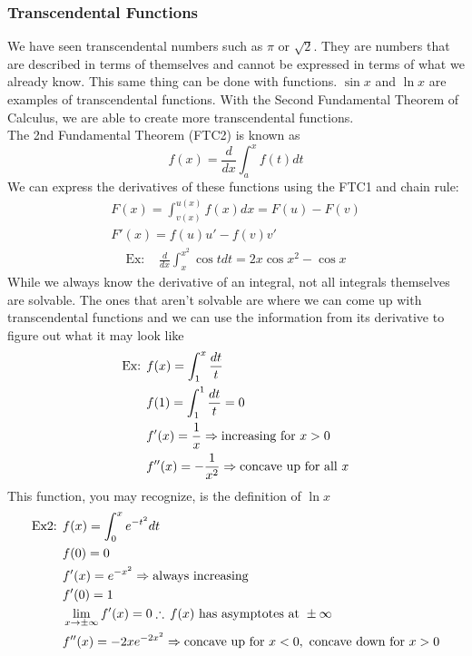 \documentclass[11pt, fleqn]{article}
\begin{document}
\subsubsection{Transcendental Functions}
We have seen transcendental numbers such as $\pi$ or $\sqrt{2}$. They are numbers that are described in terms of themselves and cannot be expressed in terms of what we already know. This same thing can be done with functions. $\sin x$ and $\ln x$ are examples of transcendental functions. With the Second Fundamental Theorem of Calculus, we are able to create more transcendental functions.\\
The 2nd Fundamental Theorem (FTC2) is known as
$$f(x)=\frac{d}{dx}\int_a^xf(t)dt$$
We can express the derivatives of these functions using the FTC1 and chain rule:\\
\begin{align*}
    F(x)=\displaystyle{\int^{u(x)}_{v(x)}f(x)dx}=F(u)-F(v)\\
    F'(x)=f(u)u'-f(v)v'
\end{align*}
\begin{align*}
    \text{Ex: }&\frac{d}{dx}\int_x^{x^2}\cos t dt=2x\cos x^2-\cos x
\end{align*}
While we always know the derivative of an integral, not all integrals themselves are solvable. The ones that aren't solvable are where we can come up with transcendental functions and we can use the information from its derivative to figure out what it may look like
\begin{align*}
    \text{Ex: }&f(x)=\int_1^x\frac{dt}{t}\\
    &f(1)=\int_1^1\frac{dt}{t}=0\\
    &f'(x)=\frac{1}{x}\Rightarrow\text{increasing for }x>0\\
    &f''(x)=-\frac{1}{x^2}\Rightarrow\text{concave up for all }x
\end{align*}
This function, you may recognize, is the definition of $\ln x$
\begin{align*}
    \text{Ex2: }&f(x)=\int_0^xe^{-t^2}dt\\
    &f(0)=0\\
    &f'(x)=e^{-x^2}\Rightarrow\text{always increasing}\\
    &f'(0)=1\\
    &\lim_{x\to\pm\infty}f'(x)=0\therefore\,f(x)\text{ has asymptotes at }\pm\infty\\
    &f''(x)=-2xe^{-2x^2}\Rightarrow\text{concave up for }x<0,\text{ concave down for }x>0
\end{align*}
\end{document}
